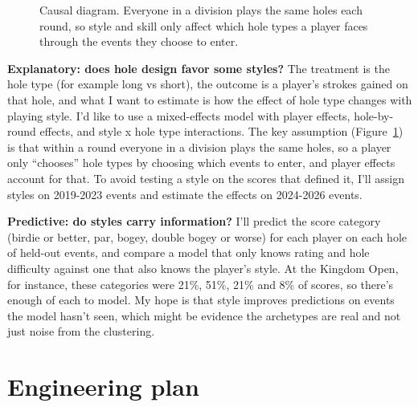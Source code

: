 \documentclass[10pt]{article}
\begin{document}
\begin{figure}[t]
\begin{minipage}[t]{0.55\textwidth}
  \caption{Causal diagram. Everyone in a division plays the same holes each
  round, so style and skill only affect which hole types a player faces through
  the events they choose to enter.}
  \label{fig:dag}
\end{minipage}
\end{figure}

\textbf{Explanatory: does hole design favor some styles?}
The treatment is the hole type (for example long vs short), the outcome is a
player's strokes gained on that hole, and what I want to estimate is how the
effect of hole type changes with playing style. I'd like to use a mixed-effects model with player effects, hole-by-round effects, and style x hole type interactions. The key assumption (Figure~\ref{fig:dag}) is that within a round everyone in a division plays the same holes, so a player only ``chooses'' hole types by choosing which events to enter, and player effects account for that. To avoid testing a style on the scores that defined it, I'll assign styles on 2019-2023 events and estimate the effects on 2024-2026 events.

\textbf{Predictive: do styles carry information?}
I'll predict the score category (birdie or better, par, bogey, double bogey or worse) for each player on each hole of held-out events, and compare a model that only knows rating and hole difficulty against one that also knows the player's style. At the Kingdom Open, for instance, these categories were 21\%, 51\%, 21\% and 8\% of scores, so there's enough of each to model. My hope is that style improves predictions on events the model hasn't seen, which might be evidence the archetypes are real and not just noise from the clustering.

\section{Engineering plan}
\end{document}
